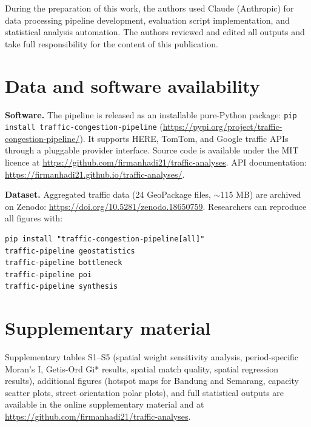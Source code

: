 \documentclass[preprint,12pt,authoryear]{elsarticle}
\begin{document}
During the preparation of this work, the authors used Claude (Anthropic) for data processing pipeline development, evaluation script implementation, and statistical analysis automation. The authors reviewed and edited all outputs and take full responsibility for the content of this publication.

\section*{Data and software availability}

\textbf{Software.}  The pipeline is released as an installable pure-Python package: \texttt{pip install traffic-congestion-pipeline} (\url{https://pypi.org/project/traffic-congestion-pipeline/}). It supports HERE, TomTom, and Google traffic APIs through a pluggable provider interface. Source code is available under the MIT licence at \url{https://github.com/firmanhadi21/traffic-analyses}. API documentation: \url{https://firmanhadi21.github.io/traffic-analyses/}.

\textbf{Dataset.}  Aggregated traffic data (24 GeoPackage files, $\sim$115 MB) are archived on Zenodo: \url{https://doi.org/10.5281/zenodo.18650759}. Researchers can reproduce all figures with:

\begin{verbatim}
pip install "traffic-congestion-pipeline[all]"
traffic-pipeline geostatistics
traffic-pipeline bottleneck
traffic-pipeline poi
traffic-pipeline synthesis
\end{verbatim}




\appendix
\section*{Supplementary material}

Supplementary tables S1--S5 (spatial weight sensitivity analysis, period-specific Moran's I, Getis-Ord Gi* results, spatial match quality, spatial regression results), additional figures (hotspot maps for Bandung and Semarang, capacity scatter plots, street orientation polar plots), and full statistical outputs are available in the online supplementary material and at \url{https://github.com/firmanhadi21/traffic-analyses}.
\end{document}
